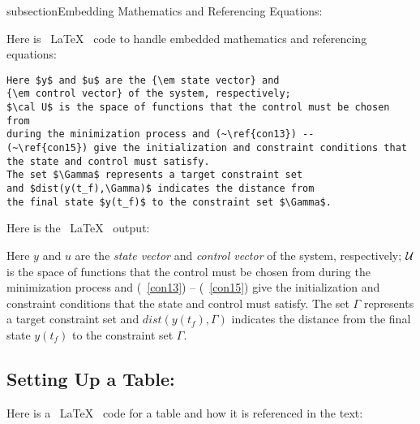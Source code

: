 \documentclass[11pt]{SelfArxOneColBMN}
\begin{document}
subsection{Embedding Mathematics and Referencing Equations:}

Here is ~\LaTeX~ code to handle embedded mathematics
and referencing equations:

\singlespacing 
{}
\begin{lstlisting}
Here $y$ and $u$ are the {\em state vector} and
{\em control vector} of the system, respectively;
$\cal U$ is the space of functions that the control must be chosen from
during the minimization process and (~\ref{con13}) --
(~\ref{con15}) give the initialization and constraint conditions that
the state and control must satisfy. 
The set $\Gamma$ represents a target constraint set
and $dist(y(t_f),\Gamma)$ indicates the distance from
the final state $y(t_f)$ to the constraint set $\Gamma$.
\end{lstlisting}
\onehalfspacing
\lstset{fancyvrb=false}

\noindent
Here is the ~\LaTeX~ output:

\noindent
Here $y$ and $u$ are the {\em state vector} and
{\em control vector} of the system, respectively;
$\cal U$ is the space of functions that the control must be chosen from
during the minimization process and (~\ref{con13}) --
(~\ref{con15}) give the initialization and constraint conditions that
the state and control must satisfy. 
The set $\Gamma$ represents a target constraint set
and $dist(y(t_f),\Gamma)$ indicates the distance from
the final state $y(t_f)$ to the constraint set $\Gamma$.

\subsection{Setting Up a Table:}

Here is a ~\LaTeX~ code for a table and how it is referenced in the text:
\end{document}
